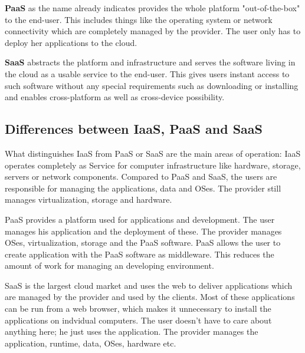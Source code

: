 \textbf{PaaS} as the name already indicates provides the whole platform "out-of-the-box" to the end-user. This includes things like the operating system or network connectivity which are completely managed by the provider. The user only has to deploy her applications to the cloud. \cite{Dialogic_Corporation}

\textbf{SaaS} abstracts the platform and infrastructure and serves the software living in the cloud as a usable service to the end-user. \cite {Dialogic_Corporation}  This gives users instant access to such software without any special requirements such as downloading or installing and enables cross-platform as well as cross-device possibility. 

\subsection{Differences between IaaS, PaaS and SaaS}
What distinguishes IaaS from PaaS or SaaS are the main areas of operation: IaaS operates completely as Service for computer infrastructure like hardware, storage, servers or network components. Compared to PaaS and SaaS, the users are responsible for managing the applications, data and OSes. The provider still manages virtualization, storage and hardware. 

PaaS provides a platform used for applications and development. The user manages his application and the deployment of these. The provider manages OSes, virtualization, storage and the PaaS software. PaaS allows the user to create application with the PaaS software as middleware. This reduces the amount of  work for managing an developing environment.

SaaS is the largest cloud market and uses the web to deliver applications which are managed by the provider and used by the clients. Most of these applications can be run from a web browser, which makes it unnecessary to install the applications on indvidual computers. The user doesn't have to care about anything here; he just uses the application. The provider manages the application, runtime, data, OSes, hardware etc.
\cite{apprenda}